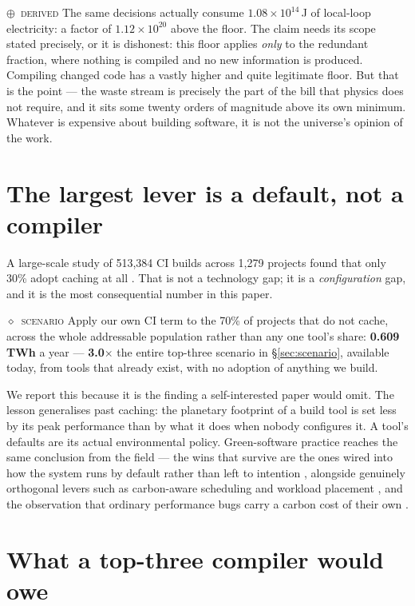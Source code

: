 \documentclass[11pt,a4paper]{article}
\providecommand{\textcite}[1]{\cite{#1}}
\newcommand{\scen}[1]{\textcolor{sigilamber}{\textbf{#1}}}
\newcommand{\stD}{\textcolor{sigilviolet}{$\oplus$}~{\scriptsize\textsc{derived}}}
\newcommand{\stC}{\textcolor{sigilred}{$\diamond$}~{\scriptsize\textsc{scenario}}}
\begin{document}
\stD{} The same decisions actually consume $1.08\times10^{14}$\,J of local-loop electricity: a factor of $1.12\times10^{20}$ above the floor. The claim needs its scope stated precisely, or it is dishonest: this floor applies \emph{only} to the redundant fraction, where nothing is compiled and no new information is produced. Compiling changed code has a vastly higher and quite legitimate floor. But that is the point --- the waste stream is precisely the part of the bill that physics does not require, and it sits some twenty orders of magnitude above its own minimum. Whatever is expensive about building software, it is not the universe's opinion of the work.


\section{The largest lever is a default, not a compiler}\label{sec:default}


A large-scale study of 513{,}384 CI builds across 1{,}279 projects found that only 30\% adopt caching at all \textcite{arxiv2601_19146}. That is not a technology gap; it is a \emph{configuration} gap, and it is the most consequential number in this paper.

\stC{} Apply our own CI term to the 70\% of projects that do not cache, across the whole addressable population rather than any one tool's share: \scen{0.609\,TWh} a year --- \scen{3.0$\times$} the entire top-three scenario in \S\ref{sec:scenario}, available today, from tools that already exist, with no adoption of anything we build.


We report this because it is the finding a self-interested paper would omit. The lesson generalises past caching: the planetary footprint of a build tool is set less by its peak performance than by what it does when nobody configures it. A tool's defaults are its actual environmental policy. Green-software practice reaches the same conclusion from the field --- the wins that survive are the ones wired into how the system runs by default rather than left to intention \textcite{arxiv2601_09741}, alongside genuinely orthogonal levers such as carbon-aware scheduling and workload placement \textcite{arxiv2405_12582,arxiv2506_10990}, and the observation that ordinary performance bugs carry a carbon cost of their own \textcite{arxiv2401_01782}.


\section{What a top-three compiler would owe}\label{sec:duties}
\end{document}
